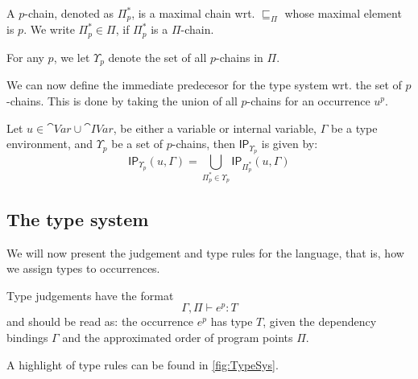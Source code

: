 \documentclass{llncs}
\newcommand{\uf}{\ensuremath{\mathsf{IP}}}
\newcommand{\sqleq}{\ensuremath{\sqsubseteq\xspace}}
\begin{document}

\begin{definition}[$p$-chains]
A $p$-chain, denoted as $\Pi_p^{*}$, is a maximal chain
wrt. $\sqleq_\Pi$ whose maximal element is $p$. We write
$\Pi_p^{*}\in\Pi$, if $\Pi_p^{*}$ is a $\Pi$-chain.

For any $p$, we let $\Upsilon_p$ denote the set of all $p$-chains in
$\Pi$.
\end{definition}


We can now define the immediate predecesor for the type system wrt. the set of $p$-chains.
This is done by taking the union of all $p$-chains for an occurrence $u^p$.

\begin{definition}\label{def:GBindUps}
	Let $u\in \cat{Var}\cup\cat{IVar}$, be either a variable or internal variable, $\Gamma$ be a type environment, and $\Upsilon_p$ be a set of $p$-chains, then $\uf_{\Upsilon_p}$ is given by:
\[
  \uf_{\Upsilon_p}(u,\Gamma)=\bigcup_{\Pi_p^{*}\in\Upsilon_p}\uf_{\Pi_p^{*}}(u,\Gamma) \]
\end{definition}



\subsection{The type system}\label{sec:Judge}
We will now present the judgement and type rules for the language, that is, how we assign types to occurrences.

Type judgements have the format
%
\[ \Gamma,\Pi\vdash e^p: T \]
%
and should be read as: the occurrence $e^p$ has type $T$, given the
dependency bindings $\Gamma$ and the approximated order of program
points $\Pi$. 

A highlight of type rules can be found in \cref{fig:TypeSys}.
\end{document}
